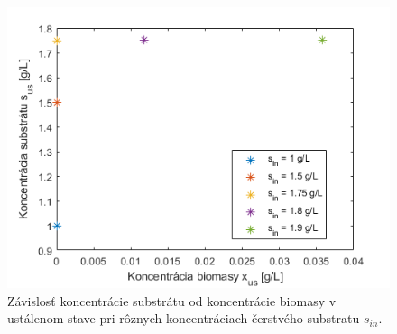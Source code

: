 \begin{figure}
	\centering
	\includegraphics[width=.7\linewidth]{images/s_in_inhb}
	\caption[]{Závislosť koncentrácie substrátu od koncentrácie biomasy v ustálenom stave pri rôznych koncentráciach čerstvého substratu $s_{in}$.}
	\label{fig:7}
\end{figure}